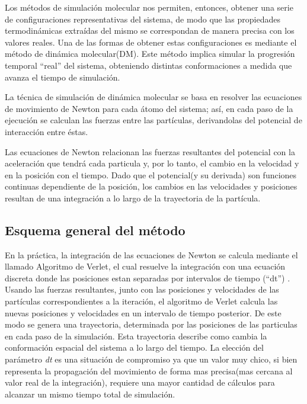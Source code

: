 Los métodos de simulación molecular nos permiten, entonces, obtener una serie de configuraciones representativas del sistema, de modo que las propiedades termodinámicas extraídas del mismo se correspondan 
de manera precisa con los valores reales.
Una de las formas de obtener estas configuraciones es mediante el método de dinámica molecular(DM). 
Este método implica simular la progresión temporal ``real'' del sistema, obteniendo distintas conformaciones a medida que avanza el tiempo de simulación.

La técnica de simulación de dinámica molecular se basa en resolver las ecuaciones de movimiento de Newton para cada átomo del sistema; así, en cada paso de la ejecución 
se calculan las fuerzas entre las partículas, derivandolas del potencial de interacción entre éstas.

Las ecuaciones de Newton relacionan las fuerzas resultantes del potencial con la aceleración que tendrá cada particula y, por lo tanto, el cambio en la velocidad y en la posición con el tiempo. 
Dado que el potencial(y su derivada) son funciones continuas dependiente de la posición, los cambios en las velocidades y posiciones resultan de una integración a lo largo de la trayectoria de la partícula.


\subsection{Esquema general del método}

En la práctica, la integración de las ecuaciones de Newton se calcula mediante el llamado Algoritmo de Verlet, el cual resuelve la integración con una ecuación discreta donde las posiciones estan separadas por intervalos de tiempo (``dt'') . 
Usando las fuerzas resultantes, junto con las posiciones y velocidades de las partículas correspondientes a la iteración, el algoritmo de Verlet calcula las nuevas posiciones y velocidades en un intervalo de tiempo posterior. 
De este modo se genera una trayectoria, determinada por las posiciones de las particulas en cada paso de la simulación. 
Esta trayectoria describe como cambia la conformación espacial del sistema a lo largo del tiempo. 
La elección del parámetro \textit{dt} es una situación de compromiso ya que un valor muy chico, si bien representa la propagación del movimiento de forma mas precisa(mas cercana al valor real de la integración), 
requiere una mayor cantidad de cálculos para alcanzar un mismo tiempo total de simulación. 




